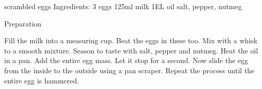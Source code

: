 
scrambled eggs
Ingredients:
3 eggs
125ml milk
1EL oil
salt, pepper, nutmeg

Preparation

Fill the milk into a measuring cup. Beat the eggs in these too. Mix with a whisk to a smooth mixture. Season to taste with salt, pepper and nutmeg.
Heat the oil in a pan. Add the entire egg mass. Let it stop for a second. Now slide the egg from the inside to the outside using a pan scraper. Repeat the process until the entire egg is hammered.
